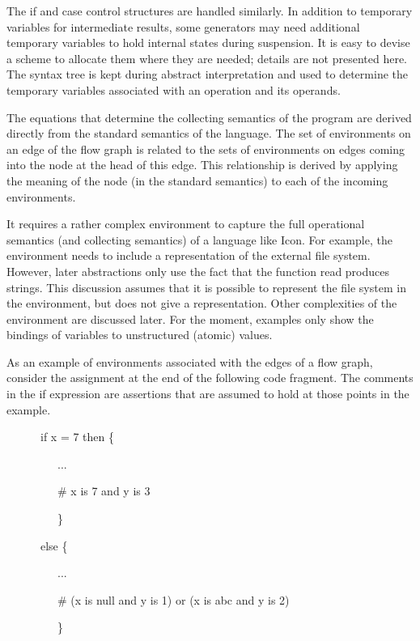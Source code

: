 The if and case control structures are handled similarly. In addition
to temporary variables for intermediate results, some generators may
need additional temporary variables to hold internal states during
suspension. It is easy to devise a scheme to allocate them where they
are needed; details are not presented here. The syntax tree is kept
during abstract interpretation and used to determine the temporary
variables associated with an operation and its operands.

The equations that determine the collecting semantics of the program
are derived directly from the standard semantics of the language. The
set of environments on an edge of the flow graph is related to the
sets of environments on edges coming into the node at the head of this
edge. This relationship is derived by applying the meaning of the node
(in the standard semantics) to each of the incoming environments.

It requires a rather complex environment to capture the full
operational semantics (and collecting semantics) of a language like
Icon. For example, the environment needs to include a representation
of the external file system.  However, later abstractions only use the
fact that the function read produces strings. This discussion assumes
that it is possible to represent the file system in the environment,
but does not give a representation. Other complexities of the
environment are discussed later. For the moment, examples only show
the bindings of variables to unstructured (atomic) values.

As an example of environments associated with the edges of a flow
graph, consider the assignment at the end of the following code
fragment. The comments in the if expression are assertions that are
assumed to hold at those points in the example.

{\ttfamily\mdseries
\ \ \ \ \ \ if x = 7 then \{}

{\ttfamily\mdseries
\ \ \ \ \ \ \ \ \ ...}

{\ttfamily\mdseries
\ \ \ \ \ \ \ \ \ \# x is 7 and y is 3}

{\ttfamily\mdseries
\ \ \ \ \ \ \ \ \ \}}

{\ttfamily\mdseries
\ \ \ \ \ \ else \{}

{\ttfamily\mdseries
\ \ \ \ \ \ \ \ \ ...}

{\ttfamily\mdseries
\ \ \ \ \ \ \ \ \ \# (x is null and y is 1) or (x is {\textquotedbl}abc{\textquotedbl} and y is 2)}

{\ttfamily\mdseries
\ \ \ \ \ \ \ \ \ \}}


